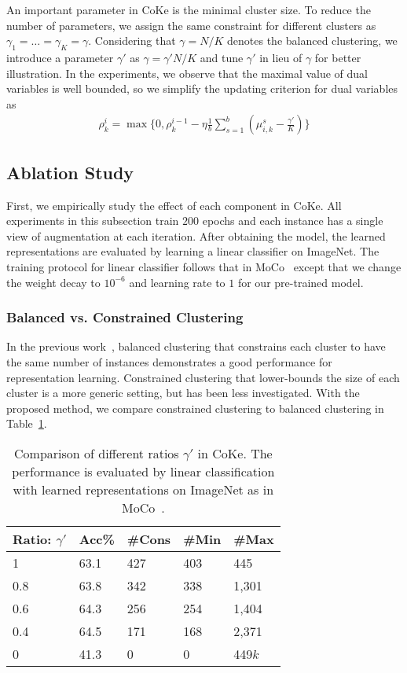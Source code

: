 \documentclass[10pt,twocolumn,letterpaper]{article}
\begin{document}
An important parameter in CoKe is the minimal cluster size. To reduce the number of parameters, we assign the same constraint for different clusters as $\gamma_1=\dots=\gamma_K=\gamma$. Considering that $\gamma = N/K$ denotes the balanced clustering, we introduce a parameter $\gamma'$ as $\gamma = \gamma' N/K$ and tune $\gamma'$ in lieu of $\gamma$ for better illustration. In the experiments, we observe that the maximal value of dual variables is well bounded, so we simplify the updating criterion for dual variables as 
\begin{eqnarray}\label{eq:finalrho}
\rho_k^i = \max\{0,\rho_k^{i-1} - \eta \frac{1}{b}\sum_{s=1}^b( \mu_{i,k}^s-\frac{\gamma'}{K})\}
\end{eqnarray}

\subsection{Ablation Study}
First, we empirically study the effect of each component in CoKe. All experiments in this subsection train $200$ epochs and each instance has a single view of augmentation at each iteration. After obtaining the model, the learned representations are evaluated by learning a linear classifier on ImageNet. The training protocol for linear classifier follows that in MoCo~\cite{He0WXG20} except that we change the weight decay to $10^{-6}$ and learning rate to $1$ for our pre-trained model. 

\subsubsection{Balanced vs. Constrained Clustering}
In the previous work~\cite{AsanoRV20a,CaronMMGBJ20}, balanced clustering that constrains each cluster to have the same number of instances demonstrates a good performance for representation learning. Constrained clustering that lower-bounds the size of each cluster is a more generic setting, but has been less investigated. With the proposed method, we compare constrained clustering to balanced clustering in Table~\ref{ta:ratio}. 

\begin{table}[!ht]
\centering
\begin{tabular}{|l|l|l|l|l|}\hline
Ratio: $\gamma'$ &Acc\%&\#Cons&\#Min&\#Max\\\hline
1 &63.1 &427&403&445\\\hline
0.8&63.8&342&338&1,301\\\hline
0.6&64.3&256&254&1,404\\\hline
0.4&64.5&171&168&2,371\\\hline
0&41.3&0&0&449$k$\\\hline
\end{tabular}
\caption{Comparison of different ratios $\gamma'$ in CoKe. The performance is evaluated by linear classification with learned representations on ImageNet as in MoCo~\cite{He0WXG20}.}\label{ta:ratio}
\end{table}
\end{document}
